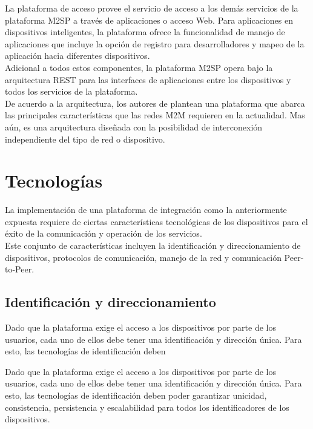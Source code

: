 \documentclass[journal]{IEEEtran}
\begin{document}
La plataforma de acceso provee el servicio de acceso a los demás servicios de la plataforma M2SP a través de aplicaciones o acceso Web. Para aplicaciones en dispositivos inteligentes, la plataforma ofrece la funcionalidad de manejo de aplicaciones que incluye la opción de registro para desarrolladores y mapeo de la aplicación hacia diferentes dispositivos.\\

Adicional a todos estos componentes, la plataforma M2SP opera bajo la arquitectura REST para las interfaces de aplicaciones entre los dispositivos y todos los servicios de la plataforma.\\

De acuerdo a la arquitectura, los autores de \cite{paper1} plantean una plataforma que abarca las principales características que las redes M2M requieren en la actualidad. Mas aún, es una arquitectura diseñada con la posibilidad de interconexión independiente del tipo de red o dispositivo.

\section{Tecnologías}

La implementación de una plataforma de integración como la anteriormente expuesta requiere de ciertas características tecnológicas de los dispositivos para el éxito de la comunicación y operación de los servicios.\\

Este conjunto de características incluyen la identificación y direccionamiento de dispositivos, protocolos de comunicación, manejo de la red y comunicación Peer-to-Peer.

\subsection{Identificación y direccionamiento}


Dado que la plataforma exige el acceso a los dispositivos por parte de los usuarios, cada uno de ellos debe tener una identificación y dirección única. Para esto, las tecnologías de identificación deben

Dado que la plataforma exige el acceso a los dispositivos por parte de los usuarios, cada uno de ellos debe tener una identificación y dirección única. Para esto, las tecnologías de identificación deben poder garantizar unicidad, consistencia, persistencia y escalabilidad para todos los identificadores de los dispositivos.\\
\end{document}
